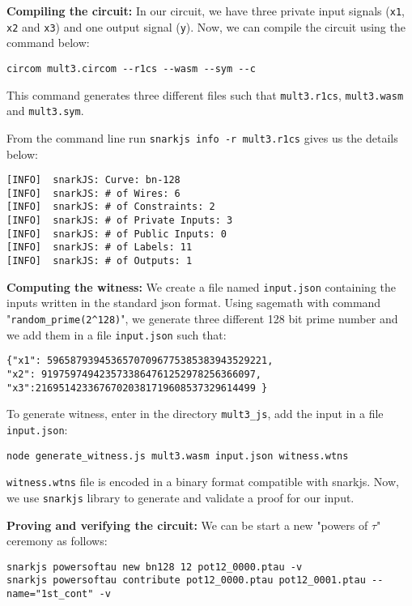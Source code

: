 \documentclass[a4paper,oneside,12pt]{book}
\begin{document}
\noindent \textbf{Compiling the circuit:} In our circuit, we have three private input signals (\verb|x1|, \verb|x2| and \verb|x3|) and one output signal (\verb|y|). Now, we can compile the circuit using the command below:

\begin{verbatim}
circom mult3.circom --r1cs --wasm --sym --c
\end{verbatim}

\noindent This command generates three different files such that \verb|mult3.r1cs|, \verb|mult3.wasm| and \verb|mult3.sym|.

\noindent From the command line run \verb|snarkjs info -r mult3.r1cs| gives us the details below:

\begin{verbatim}
[INFO]  snarkJS: Curve: bn-128
[INFO]  snarkJS: # of Wires: 6
[INFO]  snarkJS: # of Constraints: 2
[INFO]  snarkJS: # of Private Inputs: 3
[INFO]  snarkJS: # of Public Inputs: 0
[INFO]  snarkJS: # of Labels: 11
[INFO]  snarkJS: # of Outputs: 1
\end{verbatim}

\noindent \textbf{Computing the witness:} We create a file named \verb|input.json| containing the inputs written in the standard json format. Using sagemath with command "\verb|random_prime(2^128)|", we generate three different 128 bit prime number and we add them in a file \verb|input.json| such that:

\begin{verbatim}
{"x1": 59658793945365707096775385383943529221, 
"x2": 9197597494235733864761252978256366097,
"x3":21695142336767020381719608537329614499 }
\end{verbatim}

\noindent To generate witness, enter in the directory \verb|mult3_js|, add the input in a file \verb|input.json|:

\begin{verbatim}
node generate_witness.js mult3.wasm input.json witness.wtns
\end{verbatim}

\noindent \verb|witness.wtns| file is encoded in a binary format compatible with snarkjs. Now, we use \verb|snarkjs| library to generate and validate a proof for our input. 

\noindent \textbf{Proving and verifying the circuit:} We can be start a new "powers of $\tau$" ceremony as follows:
\begin{verbatim}
snarkjs powersoftau new bn128 12 pot12_0000.ptau -v
snarkjs powersoftau contribute pot12_0000.ptau pot12_0001.ptau --name="1st_cont" -v
\end{verbatim}
\end{document}
